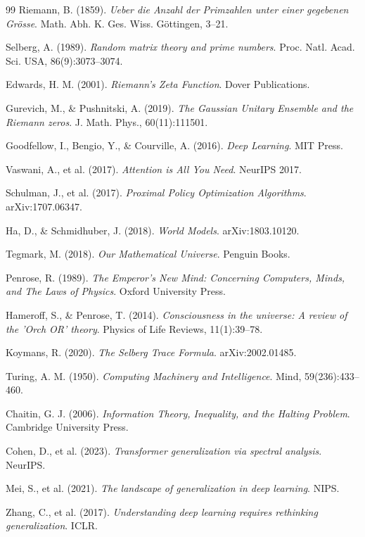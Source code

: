 \documentclass[11pt]{article}
\begin{document}
\begin{thebibliography}{99}
 Riemann, B. (1859). \emph{Ueber die Anzahl der Primzahlen unter einer gegebenen Grösse}. Math. Abh. K. Ges. Wiss. Göttingen, 3--21.

 Selberg, A. (1989). \emph{Random matrix theory and prime numbers}. Proc. Natl. Acad. Sci. USA, 86(9):3073--3074.

 Edwards, H. M. (2001). \emph{Riemann's Zeta Function}. Dover Publications.

 Gurevich, M., & Pushnitski, A. (2019). \emph{The Gaussian Unitary Ensemble and the Riemann zeros}. J. Math. Phys., 60(11):111501.

 Goodfellow, I., Bengio, Y., \& Courville, A. (2016). \emph{Deep Learning}. MIT Press.

 Vaswani, A., et al. (2017). \emph{Attention is All You Need}. NeurIPS 2017.

 Schulman, J., et al. (2017). \emph{Proximal Policy Optimization Algorithms}. arXiv:1707.06347.

 Ha, D., \& Schmidhuber, J. (2018). \emph{World Models}. arXiv:1803.10120.

 Tegmark, M. (2018). \emph{Our Mathematical Universe}. Penguin Books.

 Penrose, R. (1989). \emph{The Emperor's New Mind: Concerning Computers, Minds, and The Laws of Physics}. Oxford University Press.

 Hameroff, S., \& Penrose, T. (2014). \emph{Consciousness in the universe: A review of the 'Orch OR' theory}. Physics of Life Reviews, 11(1):39--78.

 Koymans, R. (2020). \emph{The Selberg Trace Formula}. arXiv:2002.01485.

 Turing, A. M. (1950). \emph{Computing Machinery and Intelligence}. Mind, 59(236):433--460.

 Chaitin, G. J. (2006). \emph{Information Theory, Inequality, and the Halting Problem}. Cambridge University Press.

 Cohen, D., et al. (2023). \emph{Transformer generalization via spectral analysis}. NeurIPS.

 Mei, S., et al. (2021). \emph{The landscape of generalization in deep learning}. NIPS.

 Zhang, C., et al. (2017). \emph{Understanding deep learning requires rethinking generalization}. ICLR.


\end{thebibliography}
\end{document}
